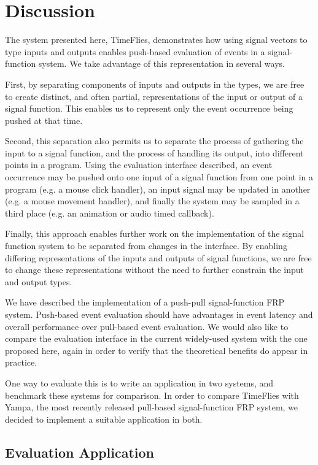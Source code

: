 \section{Discussion}
\label{section:Discussion}

The system presented here, TimeFlies, demonstrates how using signal vectors
to type inputs and outputs enables push-based evaluation of events in a
signal-function system. We take advantage of this representation in several ways.

First, by separating components of inputs and outputs in the types, we are free
to create distinct, and often partial, representations of the input or output
of a signal function. This enables us to represent only the event occurrence
being pushed at that time.

Second, this separation also permits us to separate the process of gathering
the input to a signal function, and the process of handling its output, into
different points in a program. Using the evaluation interface described, an
event occurrence may be pushed onto one input of a signal function from one
point in a program (e.g. a mouse click handler), an input signal
may be updated in another (e.g. a mouse movement handler), and finally the
system may be sampled in a third place (e.g. an animation or audio timed
callback).

Finally, this approach enables further work on the implementation of the signal
function system to be separated from changes in the interface. By enabling
differing representations of the inputs and outputs of signal functions, we are
free to change these representations without the need to further constrain the
input and output types.

We have described the implementation of a push-pull signal-function FRP system.
Push-based event evaluation should have advantages in event latency and overall
performance over pull-based event evaluation. We would also like to compare
the evaluation interface in the current widely-used system with the one proposed
here, again in order to verify that the theoretical benefits do appear in
practice.

One way to evaluate this is to write an application in two systems, and benchmark
these systems for comparison. In order to compare TimeFlies with Yampa, the most
recently released pull-based signal-function FRP system, we decided to implement
a suitable application in both.

\subsection{Evaluation Application}
\label{subsection:Evaluation_and_Comparisons-Evaluation_Application}

